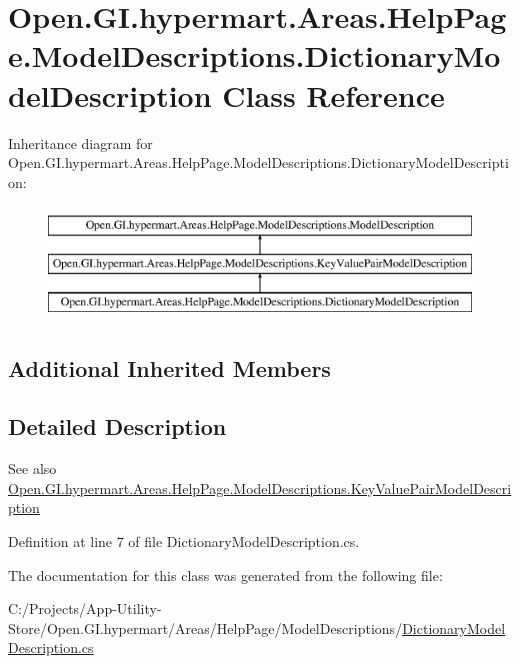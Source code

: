 \hypertarget{class_open_1_1_g_i_1_1hypermart_1_1_areas_1_1_help_page_1_1_model_descriptions_1_1_dictionary_model_description}{}\section{Open.\+G\+I.\+hypermart.\+Areas.\+Help\+Page.\+Model\+Descriptions.\+Dictionary\+Model\+Description Class Reference}
\label{class_open_1_1_g_i_1_1hypermart_1_1_areas_1_1_help_page_1_1_model_descriptions_1_1_dictionary_model_description}


 


Inheritance diagram for Open.\+G\+I.\+hypermart.\+Areas.\+Help\+Page.\+Model\+Descriptions.\+Dictionary\+Model\+Description\+:\begin{figure}[H]
\begin{center}
\leavevmode
\includegraphics[height=3.000000cm]{class_open_1_1_g_i_1_1hypermart_1_1_areas_1_1_help_page_1_1_model_descriptions_1_1_dictionary_model_description}
\end{center}
\end{figure}
\subsection*{Additional Inherited Members}


\subsection{Detailed Description}


\begin{DoxySeeAlso}{See also}
\hyperlink{class_open_1_1_g_i_1_1hypermart_1_1_areas_1_1_help_page_1_1_model_descriptions_1_1_key_value_pair_model_description}{Open.\+G\+I.\+hypermart.\+Areas.\+Help\+Page.\+Model\+Descriptions.\+Key\+Value\+Pair\+Model\+Description}


\end{DoxySeeAlso}


Definition at line 7 of file Dictionary\+Model\+Description.\+cs.



The documentation for this class was generated from the following file\+:\begin{DoxyCompactItemize}
\item 
C\+:/\+Projects/\+App-\/\+Utility-\/\+Store/\+Open.\+G\+I.\+hypermart/\+Areas/\+Help\+Page/\+Model\+Descriptions/\hyperlink{_dictionary_model_description_8cs}{Dictionary\+Model\+Description.\+cs}\end{DoxyCompactItemize}
